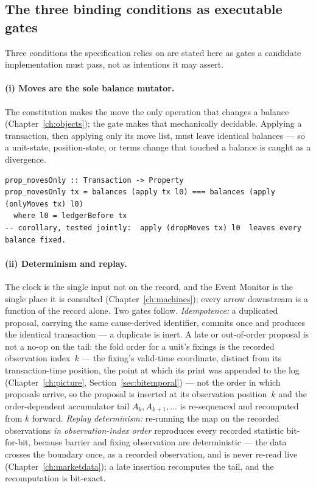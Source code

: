 \subsection{The three binding conditions as executable gates}

Three conditions the specification relies on are stated here as gates a candidate
implementation must pass, not as intentions it may assert.

\paragraph{(i) Moves are the sole balance mutator.}
The constitution makes the move the only operation that changes a balance
(Chapter~\ref{ch:objects}); the gate makes that mechanically decidable. Applying a
transaction, then applying only its move list, must leave identical balances --- so a
unit-state, position-state, or terms change that touched a balance is caught as a divergence.

\begin{lstlisting}
prop_movesOnly :: Transaction -> Property
prop_movesOnly tx = balances (apply tx l0) === balances (apply (onlyMoves tx) l0)
  where l0 = ledgerBefore tx
-- corollary, tested jointly:  apply (dropMoves tx) l0  leaves every balance fixed.
\end{lstlisting}

\paragraph{(ii) Determinism and replay.}
The clock is the single input not on the record, and the Event Monitor is the single place it
is consulted (Chapter~\ref{ch:machines}); every arrow downstream is a function of the record
alone. Two gates follow. \emph{Idempotence:} a duplicated proposal, carrying the same
cause-derived identifier, commits once and produces the identical transaction --- a
duplicate is inert. A late or out-of-order proposal is not a no-op on the tail: the
fold order for a unit's fixings is the recorded observation index~$k$ --- the fixing's
valid-time coordinate, distinct from its transaction-time position, the point at which its
print was appended to the log (Chapter~\ref{ch:picture}, Section~\ref{sec:bitemporal}) ---
not the order in which proposals arrive, so the proposal is inserted at its observation
position~$k$ and the order-dependent accumulator tail $A_{k},A_{k+1},\dots$ is re-sequenced
and recomputed from $k$ forward. \emph{Replay
determinism:} re-running the map on the recorded observations \emph{in observation-index
order} reproduces every recorded statistic bit-for-bit, because barrier and fixing
observation are deterministic --- the data crosses the boundary once, as a recorded
observation, and is never re-read live (Chapter~\ref{ch:marketdata}); a late insertion
recomputes the tail, and the recomputation is bit-exact.

